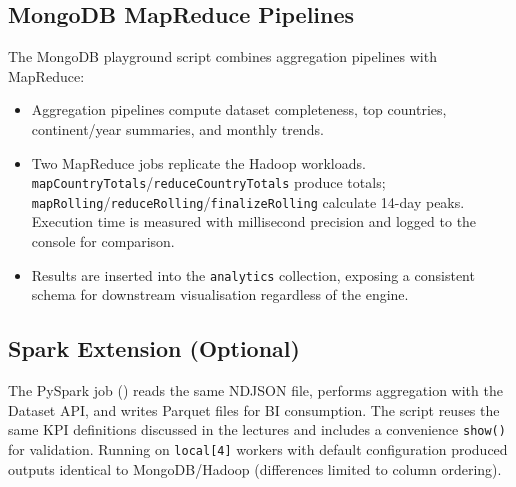 \documentclass[12pt, a4paper]{article}
\begin{document}
\subsection{MongoDB MapReduce Pipelines}
The MongoDB playground script combines aggregation pipelines with MapReduce:
\begin{itemize}[leftmargin=1.2cm]
    \item Aggregation pipelines compute dataset completeness, top countries, continent/year summaries, and monthly trends.
    \item Two MapReduce jobs replicate the Hadoop workloads. \texttt{mapCountryTotals}/\texttt{reduceCountryTotals} produce totals; \texttt{mapRolling}/\texttt{reduceRolling}/\texttt{finalizeRolling} calculate 14-day peaks. Execution time is measured with millisecond precision and logged to the console for comparison.
    \item Results are inserted into the \texttt{analytics} collection, exposing a consistent schema for downstream visualisation regardless of the engine.
\end{itemize}

\subsection{Spark Extension (Optional)}
The PySpark job () reads the same NDJSON file, performs aggregation with the Dataset API, and writes Parquet files for BI consumption. The script reuses the same KPI definitions discussed in the lectures and includes a convenience \texttt{show()} for validation. Running on \texttt{local[4]} workers with default configuration produced outputs identical to MongoDB/Hadoop (differences limited to column ordering).
\end{document}
